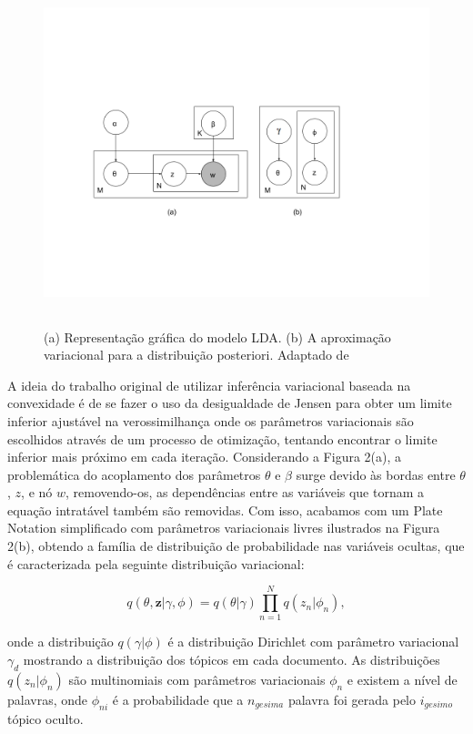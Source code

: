 \documentclass[12pt,a4paper]{article}
\begin{document}
\begin{figure}[H]
	\centering
    \includegraphics[height=10cm]{images/figure_2.png}
    \caption{(a) Representação gráfica do modelo LDA. (b) A aproximação variacional para a distribuição posteriori. Adaptado de }
\end{figure}

A ideia do trabalho original de utilizar inferência variacional baseada na convexidade é de se fazer o uso da desigualdade de Jensen para obter um limite inferior ajustável na verossimilhança \cite{jordan1999introduction} onde os parâmetros variacionais são escolhidos através de um processo de otimização,
 tentando encontrar o limite inferior mais próximo em cada iteração. Considerando a Figura 2(a), a problemática do acoplamento dos parâmetros $\theta$ e $\beta$ surge devido às bordas entre $\theta$, $z$,
 e nó $w$, removendo-os, as dependências entre as variáveis que tornam a equação intratável também são removidas. Com isso,
 acabamos com um Plate Notation simplificado com parâmetros variacionais livres ilustrados na Figura 2(b), obtendo a família de distribuição de probabilidade nas variáveis ocultas,
 que é caracterizada pela seguinte distribuição variacional:

\begin{equation}
q(\theta,\textbf{z}|\gamma,\phi)=q(\theta|\gamma)\prod_{n=1}^{N}q(z_n|\phi_n), 
\end{equation}

onde a distribuição  $q(\gamma|\phi)$ é a distribuição Dirichlet com parâmetro variacional $\gamma_d$ mostrando a distribuição dos tópicos em cada documento.
 As distribuições $q(z_n | \phi_n)$ são multinomiais com parâmetros variacionais $\phi_n$ e existem a nível de palavras, onde $\phi_{ni}$ é a probabilidade que a $n_{gesima}$ palavra foi gerada pelo $i_{gesimo}$ tópico oculto.
\end{document}
